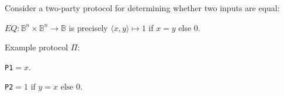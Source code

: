 Consider a two-party protocol for determining whether two inputs are equal:
\pause
\begin{example}[$Equality$]
\(EQ : \mathbb{B}^n \times \mathbb{B}^n \to \mathbb{B}\)
is precisely
\(\langle x, y \rangle \mapsto 1\)
if $x = y$ else 0.
\end{example}
\pause
Example protocol $\Pi$:\\
\begin{leftbubbles}
\texttt{P1}$=x$.
\end{leftbubbles}
\pause
\begin{rightbubbles}
\texttt{P2}$=1 \text{ if } y = x \text{ else } 0$.
\end{rightbubbles}